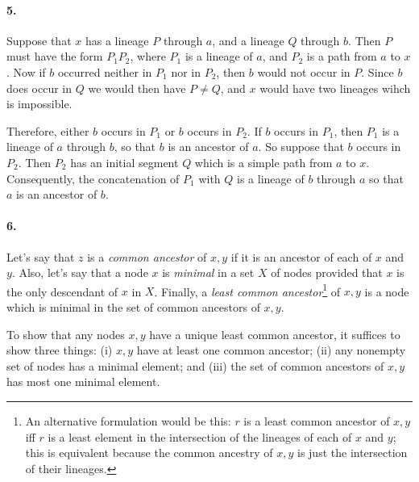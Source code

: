 \documentclass[
]{article}
\begin{document}
\paragraph{5.}  
Suppose that $x$ has a lineage $P$ through $a$,  and a lineage $Q$ through $b$.  Then $P$ must have the form $P_1P_2$, where $P_1$ is a lineage of $a$, and $P_2$ is a path from $a$ to $x$. Now if $b$ occurred neither in $P_1$ nor in $P_2$, then $b$ would not occur in $P$.  Since $b$ does occur in $Q$ we would then have $P\neq Q$, and $x$ would have two lineages wihch is impossible.  

Therefore, either $b$ occurs in $P_1$ or $b$ occurs in $P_2$. If $b$ occurs in $P_1$, then $P_1$ is a lineage of $a$ through $b$, so that $b$ is an ancestor of $a$. So suppose that $b$ occurs in $P_2$.  Then $P_2$ has an initial segment $Q$ which is a simple path from $a$ to $x$.  Consequently, the concatenation of $P_1$ with $Q$ is a lineage of $b$ through $a$ so that $a$ is an ancestor of $b$.  





\paragraph{6.} Let's say that $z$ is a \emph{common ancestor} of $x,y$ if it is an ancestor of each of $x$ and $y$.  Also, let's say that a node $x$ is \emph{minimal} in a set $X$ of nodes provided that $x$ is the only descendant of $x$ in $X$.  Finally, a \emph{least common ancestor}\footnote{An alternative formulation would be this: $r$ is a least common ancestor of $x,y$ iff $r$ is a least element in the intersection of the lineages of each of $x$ and $y$; this is equivalent because the common ancestry of $x,y$ is just the intersection of their lineages.} of $x,y$ is a node which is minimal in the set of common ancestors of $x,y$.  

To show that any nodes $x,y$ have a unique least common ancestor, it suffices to show three things: (i) $x, y$ have at least one common ancestor; (ii) any nonempty set of nodes has a minimal element; and (iii) the set of common ancestors of $x,y$ has most one minimal element.
\end{document}

